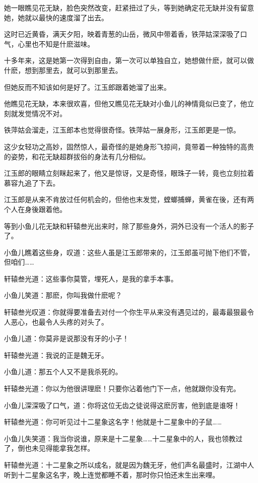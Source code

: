 \documentclass[12pt,oneside]{book}
\begin{document}
她一眼瞧见花无缺，脸色突然改变，赶紧扭过了头，等到她确定花无缺并没有留意她，她就以最快的速度溜了出去。

这时已近黄昏，满天夕阳，映着青葱的山岳，微风中带着香，铁萍姑深深吸了口气，心里也不知是什麽滋味。

十多年来，这是她第一次得到自由，第一次可以单独自立，她想做什麽，就可以做什麽，想到那里去，就可以到那里去。

但她反而不知该如何是好了。江玉郎跟着她溜了出来。

他瞧见花无缺，本来很欢喜，但他又瞧见花无缺对小鱼儿的神情竟似已变了，他立刻就发觉情况不对。

铁萍姑会溜走，江玉郎本也觉得很奇怪。铁萍姑一展身形，江玉郎更是一惊。

这少女轻功之高妙，固然惊人，最奇怪的是她身形飞掠间，竟带着一种独特的高贵的姿势，和花无缺超群拔俗的身法有几分相似。

江玉郎的眼睛立刻眯起来了，他又是惊讶，又是奇怪，眼珠子一转，竟也立刻拉着慕容九追了下去。

江玉郎是从来不肯放过任何机会的，但他也末发觉，螳螂捕蝉，黄雀在後，还有两个人在身後跟着他。

等到小鱼儿花无缺和轩辕叁光出来时，除了那些身外，洞外已没有一个活人的影子了。

小鱼儿瞧着这些身，叹道：这些人虽是江玉郎带来的，江玉郎虽可抛下他们不管，但咱们\ldots\ldots{}

轩辕叁光道：这些事你莫管，埋死人，是我的拿手本事。

小鱼儿笑道：那麽，你叫我做什麽呢？

轩辕叁光叹道：你就得要准备去对付一个你生平从来没有遇见过的，最毒最狠最令人恶心，也最令人头疼的对头了。

小鱼儿道：你莫非是说那没有牙的小子！

轩辕叁光道：我说的正是魏无牙。

小鱼儿道：那五个人又不是我杀死的。

轩辕叁光道：你以为他很讲理麽！只要你沾着他门下一点，他就跟你没有完。

小鱼儿深深吸了口气，道：你将这位无齿之徒说得这麽厉害，他到底是谁呀！

轩辕叁光道：你可听见过十二星象这名字！他就是十二星象中的子鼠\ldots\ldots{}

小鱼儿失笑道：我当你说谁，原来是十二星象\ldots\ldots 十二星象中的人，我也领教过了，倒也未见得能拿我怎样。

轩辕叁光道：十二星象之所以成名，就是因为魏无牙，他们声名最盛时，江湖中人听到十二星象这名字，晚上连觉都睡不着，那时你只怕还末生出来哩。
\end{document}
